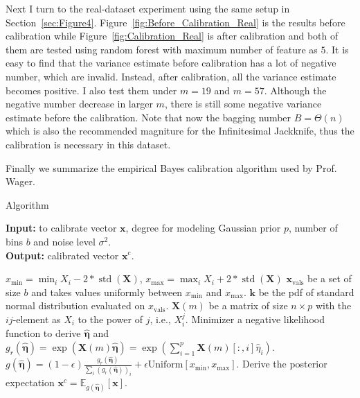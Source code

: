 \documentclass[11pt]{article}
\begin{document}
Next I turn to the real-dataset experiment using the same setup in Section~\ref{sec:Figure4}.
Figure~\ref{fig:Before_Calibration_Real} is the results before calibration while Figure~\ref{fig:Calibration_Real} is after calibration and both of them are tested using random forest with maximum number of feature as $5$.
It is easy to find that the variance estimate before calibration has a lot of negative number, which are invalid.
Instead, after calibration, all the variance estimate becomes positive.
I also test them under $m=19$ and $m=57$.
Although the negative number decrease in larger $m$, there is still some negative variance estimate before the calibration.
Note that now the bagging number $B=\Theta(n)$ which is also the recommended magniture for the Infinitesimal Jackknife, thus the calibration is necessary in this dataset.

Finally we summarize the empirical Bayes calibration algorithm used by Prof. Wager.
\begin{algorithm}
\caption{Algorithm}
\hspace*{\algorithmicindent} \textbf{Input:} to calibrate vector $\boldsymbol{x}$, degree for modeling Gaussian prior $p$, number of bins $b$ and noise level $\sigma^2$. \\
\hspace*{\algorithmicindent} \textbf{Output:} calibrated vector $\boldsymbol{x}^{\operatorname{c}}$. 
\begin{algorithmic}
	\State $x_\mathrm{min} = \min_i X_i - 2*\operatorname{std}(\boldsymbol{X})$, $x_\mathrm{max} = \max_i X_i + 2*\operatorname{std}(\boldsymbol{X})$
	\State $\boldsymbol{x}_{\mathrm{vals}}$ be a set of size $b$ and takes values uniformly between $x_\mathrm{min}$ and $x_\mathrm{max}$.
	\State $\boldsymbol{k}$ be the pdf of standard normal distribution evaluated on $x_{\mathrm{vals}}$.
	\State $\boldsymbol{X}(m)$ be a matrix of size $n\times p$ with the $ij$-element as $X_{i}$ to the power of $j$, i.e., $X_{i}^j$.
	\State Minimizer a negative likelihood function to derive $\hat{\boldsymbol{\eta}}$ and $g_{r}(\hat{\boldsymbol{\eta}}) = \exp(\boldsymbol{X}(m)\hat{\boldsymbol{\eta}}) = \exp(\sum_{i=1}^p \boldsymbol{X}(m)[:, i]\hat{\eta}_i)$.
	\State $g(\hat{\boldsymbol{\eta}}) = (1-\epsilon) \frac{g_{r}(\hat{\boldsymbol{\eta}})}{\sum_{i} (g_{r}(\hat{\boldsymbol{\eta}}))_{i}} + \epsilon \textrm{Uniform}[x_\mathrm{min}, x_\mathrm{max}]$.
	\State Derive the posterior expectation $\boldsymbol{x}^c = \mathbb{E}_{g(\hat{\boldsymbol{\eta}})}[\boldsymbol{x}]$.
\end{algorithmic}
\end{algorithm}
\end{document}
